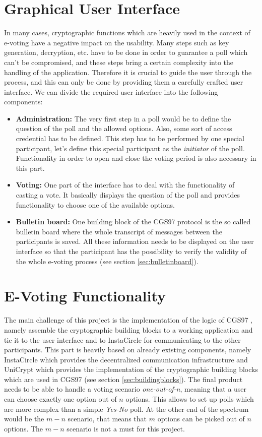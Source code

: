 \documentclass[numbers=noenddot, abstract=on, a4paper, headsepline,
footsepline, oneside, draft=off]{scrreprt}
\newcommand{\myref}[1]{(see section \vref{#1})}
\begin{document}
\section{Graphical User Interface}
\label{sec:gui}
In many cases, cryptographic functions which are heavily used in the context of
e-voting have a negative impact on the usability. Many steps such as key
generation, decryption, etc. have to be done in order to guarantee a poll which
can't be compromised, and these steps bring a certain complexity into the
handling of the application. Therefore it is crucial to guide the user
through the process, and this can only be done by providing them a carefully
crafted user interface. We can divide the required user interface into the
following components:
\begin{itemize}
  \item \textbf{Administration:} The very first step in a poll would be to
  define the question of the poll and the allowed options. Also, some sort of
  access credential has to be defined. This step has to be performed by one
  special participant, let's define this special participant as the
  \textit{initiator} of the poll. Functionality in order to open and close the
  voting period is also necessary in this part.
  \item \textbf{Voting:} One part of the interface has to deal with the
  functionality of casting a vote. It basically displays the question of the
  poll and provides functionality to choose one of the available options.
  \item \textbf{Bulletin board:} One building block of the CGS97 protocol
  \cite{CGS97} is the so called bulletin board where the whole transcript of
  messages between the participants is saved. All these information needs to be displayed on the
  user interface so that the participant has the possibility to verify the
  validity of the whole e-voting process \myref{sec:bulletinboard}.
\end{itemize}

\section{E-Voting Functionality}
\label{sec:evotingfunctionality}
The main challenge of this project is the implementation of the logic of CGS97 
\cite{CGS97}, namely assemble the cryptographic building blocks to a working
application and tie it to the user interface and to InstaCircle for communicating to the other
participants. This part is heavily based on already existing components, namely
InstaCircle which provides the decentralized communication infrastructure and
UniCrypt which provides the implementation of the cryptographic building blocks
which are used in CGS97 \myref{sec:buildingblocks}. The final product needs to
be able to handle a voting scenario \emph{one-out-of-n}, meaning that a user can
choose exactly one option out of $n$ options. This allows to set up polls which are more
complex than a simple \emph{Yes-No} poll. At the other end of the spectrum would
be the $m-n$ scenario, that means that $m$ options can be picked out of $n$
options. The $m-n$ scenario is not a must for this project.
\end{document}
